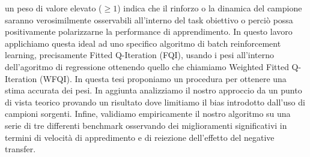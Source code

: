 un peso di valore elevato ($\geq 1$) indica che il rinforzo o la dinamica del campione saranno verosimilmente
osservabili all'interno del task obiettivo o perciò possa positivamente polarizzarne la performance di apprendimento.\newline
In questo lavoro applichiamo questa ideal ad uno specifico algoritmo di batch reinforcement learning, precisamente Fitted Q-Iteration (FQI),
usando i pesi all'interno dell'agoritmo di regressione ottenendo quello che chiamiamo Weighted Fitted Q-Iteration (WFQI).
In questa tesi proponiamo un procedura per ottenere una stima accurata dei pesi. In aggiunta analizziamo il nostro approccio
da un punto di vista teorico provando un risultato dove limitiamo il bias introdotto dall'uso di campioni sorgenti. Infine,
validiamo empiricamente il nostro algoritmo su una serie di tre differenti benchmark osservando dei miglioramenti
significativi in termini di velocità di appredimento e di reiezione dell'effetto del negative transfer.

%
\endgroup
